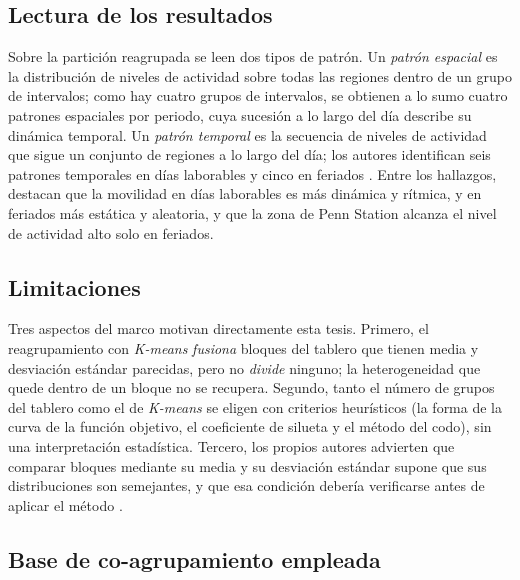 \subsection{Lectura de los resultados}

Sobre la partición reagrupada se leen dos tipos de patrón. Un \emph{patrón
espacial} es la distribución de niveles de actividad sobre todas las regiones
dentro de un grupo de intervalos; como hay cuatro grupos de intervalos, se
obtienen a lo sumo cuatro patrones espaciales por periodo, cuya sucesión a lo
largo del día describe su dinámica temporal. Un \emph{patrón temporal} es la
secuencia de niveles de actividad que sigue un conjunto de regiones a lo largo
del día; los autores identifican seis patrones temporales en días laborables y
cinco en feriados \cite[Sec.~IV.D]{Liu2021}. Entre los hallazgos, destacan que la
movilidad en días laborables es más dinámica y rítmica, y en feriados más
estática y aleatoria, y que la zona de Penn Station alcanza el nivel de actividad
alto solo en feriados.

\subsection{Limitaciones}\label{sec:stcc-limitaciones}

Tres aspectos del marco motivan directamente esta tesis. Primero, el
reagrupamiento con \textit{K-means} \emph{fusiona} bloques del tablero que tienen
media y desviación estándar parecidas, pero no \emph{divide} ninguno; la
heterogeneidad que quede dentro de un bloque no se recupera. Segundo, tanto el
número de grupos del tablero como el de \textit{K-means} se eligen con criterios
heurísticos (la forma de la curva de la función objetivo, el coeficiente de
silueta y el método del codo), sin una interpretación estadística. Tercero, los
propios autores advierten que comparar bloques mediante su media y su desviación
estándar supone que sus distribuciones son semejantes, y que esa condición
debería verificarse antes de aplicar el método \cite[Sec.~IV.E]{Liu2021}.

\subsection{Base de co-agrupamiento empleada}\label{sec:stcc-base}

